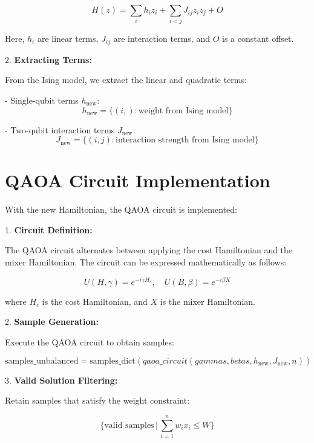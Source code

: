 \documentclass{article}
\begin{document}
   \[
   H(z) = \sum_{i} h_i z_i + \sum_{i < j} J_{ij} z_i z_j + O
   \]

   Here, \( h_i \) are linear terms, \( J_{ij} \) are interaction terms, and \( O \) is a constant offset.

2. \textbf{Extracting Terms:}

   From the Ising model, we extract the linear and quadratic terms:

   - Single-qubit terms \( h_{\text{new}} \):
     \[
     h_{\text{new}} = \{(i,): \text{weight from Ising model}\}
     \]

   - Two-qubit interaction terms \( J_{\text{new}} \):
     \[
     J_{\text{new}} = \{(i,j): \text{interaction strength from Ising model}\}
     \]

\section{QAOA Circuit Implementation}

With the new Hamiltonian, the QAOA circuit is implemented:

1. \textbf{Circuit Definition:}

   The QAOA circuit alternates between applying the cost Hamiltonian and the mixer Hamiltonian. The circuit can be expressed mathematically as follows:

   \[
   U(H, \gamma) = e^{-i \gamma H_c}, \quad U(B, \beta) = e^{-i \beta X}
   \]

   where \( H_c \) is the cost Hamiltonian, and \( X \) is the mixer Hamiltonian.

2. \textbf{Sample Generation:}

   Execute the QAOA circuit to obtain samples:

   \[
   \text{samples\_unbalanced} = \text{samples\_dict}(qaoa\_circuit(gammas, betas, h_{\text{new}}, J_{\text{new}}, n))
   \]

3. \textbf{Valid Solution Filtering:}

   Retain samples that satisfy the weight constraint:

   \[
   \{ \text{valid samples} \, | \, \sum_{i=1}^{n} w_i x_i \leq W \}
   \]
\end{document}
